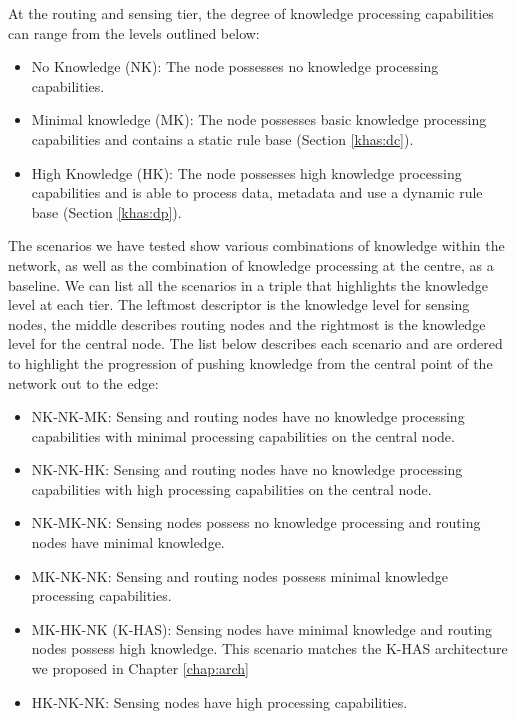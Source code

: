At the routing and sensing tier, the degree of knowledge processing capabilities can range from the levels outlined below:

	\begin{itemize}
		\item No Knowledge (NK): The node possesses no knowledge processing capabilities.
		\item Minimal knowledge (MK): The node possesses basic knowledge processing capabilities and contains a static rule base (Section \ref{khas:dc}).
		\item High Knowledge (HK): The node possesses high knowledge processing capabilities and is able to process data, metadata and use a dynamic rule base (Section \ref{khas:dp}).
	\end{itemize}

The scenarios we have tested show various combinations of knowledge within the network, as well as the combination of knowledge processing at the centre, as a baseline. We can list all the scenarios in a triple that highlights the knowledge level at each tier. The leftmost descriptor is the knowledge level for sensing nodes, the middle describes routing nodes and the rightmost is the knowledge level for the central node. The list below describes each scenario and are ordered to highlight the progression of pushing knowledge from the central point of the network out to the edge:

	\begin{itemize}
		\item NK-NK-MK: Sensing and routing nodes have no knowledge processing capabilities with minimal processing capabilities on the central node.
		\item NK-NK-HK: Sensing and routing nodes have no knowledge processing capabilities with high processing capabilities on the central node.
		\item NK-MK-NK: Sensing nodes possess no knowledge processing and routing nodes have minimal knowledge.
		\item MK-NK-NK: Sensing and routing nodes possess minimal knowledge processing capabilities.
		\item MK-HK-NK (K-HAS): Sensing nodes have minimal knowledge and routing nodes possess high knowledge. This scenario matches the K-HAS architecture we proposed in Chapter \ref{chap:arch}
		\item HK-NK-NK: Sensing nodes have high processing capabilities.	
	\end{itemize}

